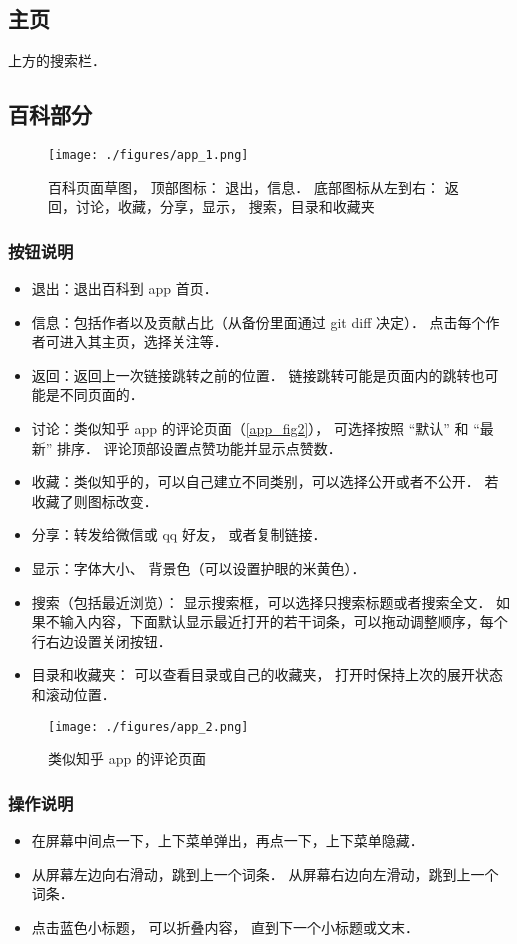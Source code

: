 
\subsection{主页}
上方的搜索栏．

\subsection{百科部分}
\begin{figure}[ht]
\centering
\texttt{[image: ./figures/app\_1.png]}
\caption{百科页面草图， 顶部图标： 退出，信息． 底部图标从左到右： 返回，讨论，收藏，分享，显示， 搜索，目录和收藏夹}\label{app_fig1}
\end{figure}

\subsubsection{按钮说明}
\begin{itemize}
\item 退出：退出百科到 app 首页．
\item 信息：包括作者以及贡献占比（从备份里面通过 git diff 决定）． 点击每个作者可进入其主页，选择关注等．
\item 返回：返回上一次链接跳转之前的位置． 链接跳转可能是页面内的跳转也可能是不同页面的．
\item 讨论：类似知乎 app 的评论页面（\autoref{app_fig2}）， 可选择按照 “默认” 和 “最新” 排序． 评论顶部设置点赞功能并显示点赞数．
\item 收藏：类似知乎的，可以自己建立不同类别，可以选择公开或者不公开． 若收藏了则图标改变．
\item 分享：转发给微信或 qq 好友， 或者复制链接．
\item 显示：字体大小、 背景色（可以设置护眼的米黄色）．
\item 搜索（包括最近浏览）： 显示搜索框，可以选择只搜索标题或者搜索全文． 如果不输入内容，下面默认显示最近打开的若干词条，可以拖动调整顺序，每个行右边设置关闭按钮．
\item 目录和收藏夹： 可以查看目录或自己的收藏夹， 打开时保持上次的展开状态和滚动位置．
\end{itemize}

\begin{figure}[ht]
\centering
\texttt{[image: ./figures/app\_2.png]}
\caption{类似知乎 app 的评论页面} \label{app_fig2}
\end{figure}

\subsubsection{操作说明}
\begin{itemize}
\item 在屏幕中间点一下，上下菜单弹出，再点一下，上下菜单隐藏．
\item 从屏幕左边向右滑动，跳到上一个词条． 从屏幕右边向左滑动，跳到上一个词条．
\item 点击蓝色小标题， 可以折叠内容， 直到下一个小标题或文末．
\end{itemize}

